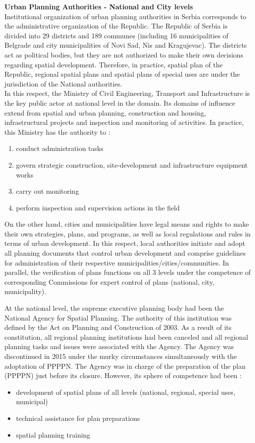 \documentclass[11pt]{report}
\begin{document}
\textbf{Urban Planning Authorities - National and City levels}
\\
Institutional organization of urban planning authorities in Serbia corresponds to the administrative organization of the Republic.
The Republic of Serbia is divided into 29 districts and 189 communes (including 16 municipalities of Belgrade and city municipalities of Novi Sad, Nis and Kragujevac).
The districts act as political bodies, but they are not authorized to make their own decisions regarding spatial development.
Therefore, in practice, spatial plan of the Republic, regional spatial plans and spatial plans of special uses are under the jurisdiction of the National authorities.
\\
In this respect, the Ministry of Civil Engineering, Transport and Infrastructure is the key public actor at national level in the domain. Its domains of influence extend from spatial and urban planning, construction and housing, infrastructural projects and inspection and monitoring of activities. In practice, this Ministry has the authority to  \cite{(Maksic 2012)}:
\begin{enumerate}
\item conduct administration tasks
\item govern strategic construction, site-development and infrastructure equipment works
\item carry out monitoring
\item perform inspection and supervision actions in the field
\end{enumerate} 
On the other hand, cities and municipalities have legal means and rights to make their own strategies, plans, and programs, as well as local regulations and rules in terms of urban development. In this respect, local authorities initiate and adopt all planning documents that control urban development and comprise guidelines for administration of their respective municipalities/cities/communities. In parallel, the verification of plans functions on all 3 levels under the competence of corresponding Commissions for expert control of plans (national, city, municipality).

At the national level, the supreme executive planning body had been the National Agency for Spatial Planning. The authority of this institution was  defined by the Act on Planning and Construction of 2003.
As a result of its constitution, all regional planning institutions had been canceled and all regional planning tasks and issues were associated with the Agency. 
The Agency was discontinued in 2015 under the murky circumstances simultaneously with the adoptation of PPPPN. The Agency was in charge of the preparation of the plan (PPPPN) just before its closure. However, its sphere of competence had been \cite{Maksic 2012}:
\begin{itemize}
\item development of spatial plans of all levels (national, regional, special uses, municipal)
\item technical assistance for plan preparations
\item spatial planning training
\end{itemize}
\end{document}
